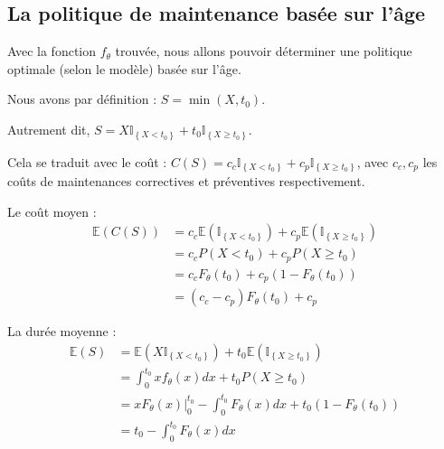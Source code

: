 \documentclass[10pt,a4paper]{article}
\begin{document}
\FloatBarrier

\subsection{La politique de maintenance basée sur l'âge}

Avec la fonction $f_\theta$ trouvée, nous allons pouvoir déterminer une politique optimale (selon le modèle) basée sur l'âge.

Nous avons par définition : $S = \min \left( {X,{t_0}} \right)$.

Autrement dit, $S = X{\mathbb{I}_{\left\{ {X < {t_0}} \right\}}} + {t_0}{\mathbb{I}_{\left\{ {X \geqslant {t_0}} \right\}}}$.

Cela se traduit avec le coût : $C\left( S \right) = {c_c}{\mathbb{I}_{\left\{ {X < {t_0}} \right\}}} + {c_p}{\mathbb{I}_{\left\{ {X \geqslant {t_0}} \right\}}}$, avec $c_c, c_p$ les coûts de maintenances correctives et préventives respectivement.

Le coût moyen :
\begin{align}
    \label{coutmoy}
    \mathbb{E}\left( {C\left( S \right)} \right) & = {c_c}\mathbb{E}\left( {{\mathbb{I}_{\left\{ {X < {t_0}} \right\}}}} \right) + {c_p}\mathbb{E}\left( {{\mathbb{I}_{\left\{ {X \geqslant {t_0}} \right\}}}} \right) \nonumber \\
    & = {c_c}P\left( {X < {t_0}} \right) + {c_p}P\left( {X \geqslant {t_0}} \right) \nonumber \\
    & = {c_c}{F_\theta }\left( {{t_0}} \right) + {c_p}\left( {1 - {F_\theta }\left( {{t_0}} \right)} \right) \nonumber \\
    & = \left( {{c_c} - {c_p}} \right){F_\theta }\left( {{t_0}} \right) + {c_p}
\end{align}

La durée moyenne :
\begin{align}
    \label{dureemoy}
    \mathbb{E}\left( S \right) & = \mathbb{E}\left( {X{\mathbb{I}_{\left\{ {X < {t_0}} \right\}}}} \right) + {t_0}\mathbb{E}\left( {{\mathbb{I}_{\left\{ {X \geqslant {t_0}} \right\}}}} \right)\nonumber\\
    & = \int_0^{{t_0}} {x{f_\theta }\left( x \right)dx}  + {t_0}P\left( {X \geqslant {t_0}} \right) \nonumber \\
    & = x{F_\theta }\left( x \right)|_0^{{t_0}} - \int_0^{{t_0}} {{F_\theta }\left( x \right)dx}  + {t_0}\left( {1 - {F_\theta }\left( {{t_0}} \right)} \right) \nonumber \\
    & = {t_0} - \int_0^{{t_0}} {{F_\theta }\left( x \right)dx}
\end{align}
\end{document}
